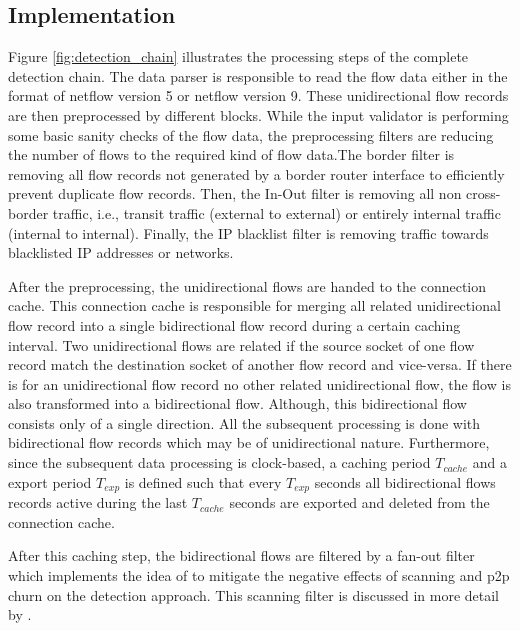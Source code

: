 \subsection{Implementation}
Figure \ref{fig:detection_chain} illustrates the processing steps of the complete detection chain. The data parser is responsible to read the flow data either in the format of \gls{netflow} version 5 or \gls{netflow} version 9. These unidirectional flow records are then preprocessed by different blocks. While the input validator is performing some basic sanity checks of the flow data, the preprocessing filters are reducing the number of flows to the required kind of flow data.The border filter is removing all flow records not generated by a border router interface to efficiently prevent duplicate flow records. Then, the In-Out filter is removing all non cross-border traffic, i.e., transit traffic (external to external) or entirely internal traffic (internal to internal). Finally, the IP blacklist filter is removing traffic towards blacklisted IP addresses or networks.

After the preprocessing, the unidirectional flows are handed to the connection cache. This connection cache is responsible for merging all related unidirectional flow record into a single bidirectional flow record during a certain caching interval. 
Two unidirectional flows are related if the source socket of one flow record match the destination socket of another flow record and vice-versa\citep{Schatzmann:Tracing}. If there is for an unidirectional flow record no other related unidirectional flow, the flow is also transformed into a bidirectional flow. Although, this bidirectional flow consists only of a single direction. All the subsequent processing is done with bidirectional flow records which may be of unidirectional nature. 
Furthermore, since the subsequent data processing is clock-based, a caching period $T_{cache}$ and a export period $T_{exp}$ is defined such that every $T_{exp}$ seconds all bidirectional flows records active during the last $T_{cache}$ seconds are exported and deleted from the connection cache.

After this caching step, the bidirectional flows are filtered by a fan-out filter which implements the idea of \citet{Allman:2007} to mitigate the negative effects of scanning and \gls{p2p} churn on the detection approach. This scanning filter is discussed in more detail by \citet{Schatzmann:Mining,Schatzmann:Dissection,Schatzmann:Tracing}.

